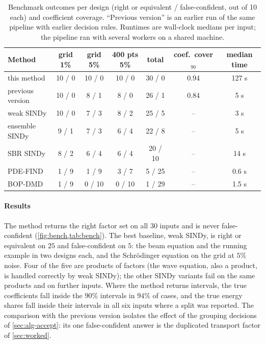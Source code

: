 \documentclass[11pt]{article}
\theoremstyle{plain}
\theoremstyle{definition}
\theoremstyle{remark}
\begin{document}
\begin{table}[tbp]
\centering\small
\caption{Benchmark outcomes per design (right or equivalent / false-confident, out of 10 each) and coefficient
coverage. ``Previous version'' is an earlier run of the same pipeline with earlier decision rules. Runtimes are wall-clock medians per input; the pipeline ran
with several workers on a shared machine.}\label{tab:bench}
\begin{tabular}{@{}lcccccc@{}}
\toprule
Method & grid 1\% & grid 5\% & 400 pts 5\% & total & coef.\ cover$_{90}$ & median time\\
\midrule
this method        & 10 / 0 & 10 / 0 & 10 / 0 & 30 / 0 & 0.94 & 127 s\\
previous version   & 10 / 0 & \phantom{1}8 / 1 & \phantom{1}8 / 0 & 26 / 1 & 0.84 & 5 s\\
weak SINDy         & 10 / 0 & \phantom{1}7 / 3 & \phantom{1}8 / 2 & 25 / 5 & -- & 3 s\\
ensemble SINDy     & \phantom{1}9 / 1 & \phantom{1}7 / 3 & \phantom{1}6 / 4 & 22 / 8 & -- & 5 s\\
SBR SINDy          & \phantom{1}8 / 2 & \phantom{1}6 / 4 & \phantom{1}6 / 4 & 20 / 10 & -- & 14 s\\
PDE-FIND           & \phantom{1}1 / 9 & \phantom{1}1 / 9 & \phantom{1}3 / 7 & \phantom{1}5 / 25 & -- & 0.6 s\\
BOP-DMD            & \phantom{1}1 / 9 & \phantom{1}0 / 10 & \phantom{1}0 / 10 & \phantom{1}1 / 29 & -- & 1.5 s\\
\bottomrule
\end{tabular}
\end{table}

\paragraph{Results} The method returns the right factor set on all $30$ inputs and is never
false-confident (\cref{fig:bench,tab:bench}). The best baseline, weak SINDy, is right or equivalent on $25$
and false-confident on $5$: the beam equation and the running example in two designs each, and the
Schr\"odinger equation on the grid at $5\%$ noise. Four of the five are products of factors (the wave equation, also a
product, is handled correctly by weak SINDy); the other SINDy variants fail on the same products and on further
inputs. Where the method returns intervals, the true coefficients fall inside the $90\%$ intervals in
$94\%$ of cases, and the true energy shares fall inside their intervals in all six inputs where a split was reported. The comparison with the previous version isolates the effect of the grouping decisions of
\cref{sec:alg-accept}: its one false-confident answer is the duplicated transport factor of
\cref{sec:worked}.
\end{document}
